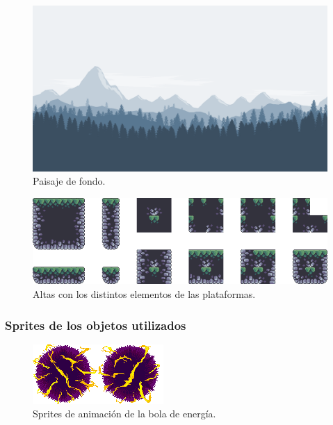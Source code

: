 \documentclass[12pt, spanish]{article}
\begin{document}
\begin{figure}[H]
	\centering
	\includegraphics[width=\textwidth]{"multimedia/landscape.png"}
	\caption{Paisaje de fondo.}\label{figure:landscape}
\end{figure}

\begin{figure}[H]
	\centering
	\includegraphics[width=\textwidth]{"multimedia/terrain.png"}
	\caption{Altas con los distintos elementos de las plataformas.}\label{figure:terrain}
\end{figure}

\subsubsection{Sprites de los objetos utilizados}

\begin{figure}[H]
	\centering
	\includegraphics[width=\textwidth]{"multimedia/energy_ball.png"}
	\caption{Sprites de animación de la bola de energía.}\label{figure:energy_ball}
\end{figure}
\end{document}
